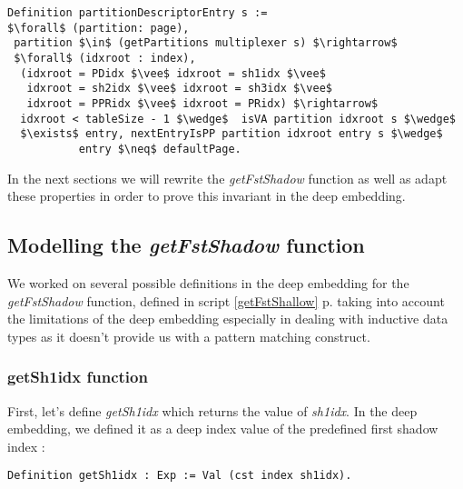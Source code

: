 \begin{itemize}
\begin{lstlisting}[caption={partitionDescriptorEntry property},mathescape=true, xleftmargin=-.05\textwidth,label={descrip}]
Definition partitionDescriptorEntry s := 
$\forall$ (partition: page),  
 partition $\in$ (getPartitions multiplexer s) $\rightarrow$ 
 $\forall$ (idxroot : index), 
  (idxroot = PDidx $\vee$ idxroot = sh1idx $\vee$ 
   idxroot = sh2idx $\vee$ idxroot = sh3idx $\vee$ 
   idxroot = PPRidx $\vee$ idxroot = PRidx) $\rightarrow$
  idxroot < tableSize - 1 $\wedge$  isVA partition idxroot s $\wedge$  
  $\exists$ entry, nextEntryIsPP partition idxroot entry s $\wedge$  
           entry $\neq$ defaultPage.
\end{lstlisting} 
\vspace{4pt}	
\end{itemize}
In the next sections we will rewrite the \textit{getFstShadow} function as well as adapt these properties in order to prove this invariant in the deep embedding.


\subsection{Modelling the \textit{getFstShadow} function}
We worked on several possible definitions in the deep embedding for the \textit{getFstShadow} function, defined in script \ref{getFstShallow} p.\pageref{getFstShallow} taking into account the limitations of the deep embedding especially in dealing with inductive data types as it doesn’t provide us with a pattern matching construct.

\subsubsection{getSh1idx function} 
First, let's define \textit{getSh1idx} which returns the value of \textit{sh1idx}. In the deep embedding, we defined it as a deep index value of the predefined first shadow index :
\begin{lstlisting}[caption = {getSh1idx definition  in the deep embedding},xleftmargin=.02\textwidth,
xrightmargin=.02\textwidth]
Definition getSh1idx : Exp := Val (cst index sh1idx).
\end{lstlisting} 
